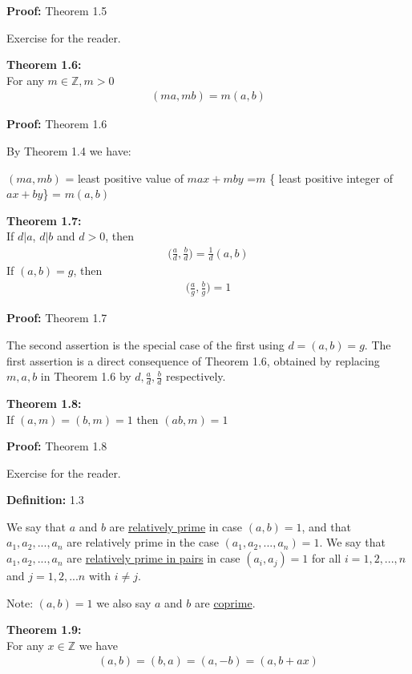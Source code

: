 \documentclass[a4paper]{article}
\begin{document}
\textbf{Proof:} Theorem 1.5

Exercise for the reader.



\textbf{Theorem 1.6:}\\
For any $m\in\mathbb{Z}, m>0$
\begin{align}
    (ma,mb)=m(a,b)
\end{align}

\textbf{Proof:} Theorem 1.6

By Theorem 1.4 we have:

$(ma,mb)$ = least positive value of $max+mby$ =$m$ \{ least positive integer of $ax+by$\} = $m(a,b)$

\textbf{Theorem 1.7:}\\
If $d|a$, $d|b$ and $d>0$, then
\begin{align}
    \bigg(\frac{a}{d},\frac{b}{d}\bigg)=\frac{1}{d}(a,b)
\end{align}
If $(a,b)=g$, then
\begin{align}
    \bigg(\frac{a}{g},\frac{b}{g}\bigg)=1
\end{align}



\textbf{Proof:} Theorem 1.7

The second assertion is the special case of the first using $d=(a,b)=g$. The first assertion is a direct consequence of Theorem 1.6, obtained by replacing $m,a,b$ in Theorem 1.6 by $d,\frac{a}{d},\frac{b}{d}$ respectively.

\textbf{Theorem 1.8:}\\
If $(a,m)=(b,m)=1$ then $(ab,m)=1$

\textbf{Proof:} Theorem 1.8

Exercise for the reader.

\textbf{Definition:} 1.3

We say that $a$ and $b$ are \underline{relatively prime} in case $(a,b)=1$, and that $a_1,a_2,...,a_n$ are relatively prime in the case $(a_1,a_2,...,a_n)=1$. We say that $a_1,a_2,...,a_n$ are \underline{relatively prime in pairs} in case $(a_i,a_j)=1$ for all $i=1,2,...,n$ and $j=1,2,...n$ with $i \neq j$.

Note: $(a,b)=1$ we also say $a$ and $b$ are \underline{coprime}.

\textbf{Theorem 1.9:}\\
For any $x\in\mathbb{Z}$ we have
\begin{align}
(a,b)=(b,a)=(a,-b)=(a,b+ax)
\end{align}
\end{document}
